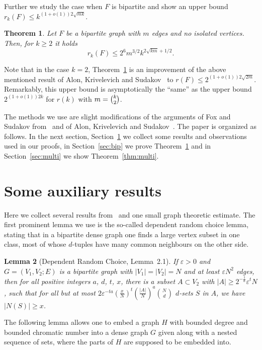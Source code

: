 \documentclass[reqno]{amsart}
\newtheorem{theorem}                   {Theorem}%
\newtheorem{lemma}           [theorem] {Lemma}
\theoremstyle{remark}
\newcommand{\eps}{\varepsilon}
\begin{document}
Further we study the case when $F$ is bipartite and show an upper bound 
$r_k(F)\le  k^{(1+o(1))2\sqrt{mk}}$. 
\begin{theorem}\label{thm:bip}
 Let $F$ be a bipartite graph with $m$ edges and no isolated vertices. Then, for $k\ge 2$  it holds  
\[
  r_k(F)\le 2^6 m^{3/2} k^{2\sqrt{km}+1/2}.
\]
\end{theorem}
Note that in the case $k=2$, Theorem~\ref{thm:bip} is an improvement of the above mentioned result 
of Alon, Krivelevich and Sudakov~\cite{AKS03} to $r(F)\le 2^{(1+o(1))2\sqrt{2m}}$. 
Remarkably, this upper bound is asymptotically the ``same'' as the upper bound $2^{(1+o(1))2k}$ for $r(k)$ with $m=\tbinom{k}{2}$. 

The methods we use are  slight modifications of the arguments of Fox and Sudakov from~\cite{FoxSud09a} and of Alon, Krivelevich and Sudakov~\cite{AKS03}. 
The paper is organized as follows. In the next section, Section~\ref{sec:tools} we collect some results and observations used in our proofs, in 
Section~\ref{sec:bip} we prove Theorem~\ref{thm:bip} and in Section~\ref{sec:multi} we show Theorem~\ref{thm:multi}.

\section{Some auxiliary results}\label{sec:tools}
Here we collect several results from~\cite{FoxSud09a} and one small graph theoretic estimate. 
The first prominent lemma we use is the so-called dependent random choice lemma, stating 
that in a bipartite dense graph one finds a large vertex subset in one class, 
most of whose $d$-tuples have many common neighbours on the other side.

\begin{lemma}[Dependent Random Choice, Lemma~2.1\cite{FoxSud09a}]\label{lem:drc}
If $\eps > 0$ and $G = (V_1, V_2; E)$  is a bipartite graph with $|V_1| = |V_2| = N$ and at least $\eps N^2$ edges, then for all 
positive integers $a$, $d$, $t$, $x$, there is a subset $A \subset V_2$ with $|A| \geq 2^{- \frac{1}{a}} \eps^t N$, such 
that for all but at most $2 \eps^{-ta} \left(\tfrac{x}{N} \right)^t \left(\tfrac{|A|}{N} \right)^a \binom{N}{d}$ $d$-sets $S$ in $A$, we have $|N(S)| \geq x$.
\end{lemma}

The following lemma allows one to embed a graph $H$ with bounded degree and bounded chromatic number into a dense graph $G$ given along with a nested sequence of sets, where 
the parts of $H$ are supposed to be embedded into. 
\end{document}

